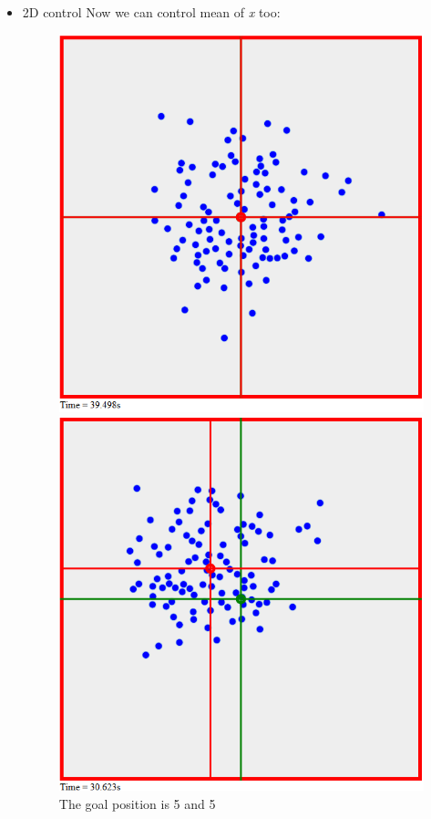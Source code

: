\begin{itemize}
\item 2D control
Now we can control mean of \emph{x} too:
\begin{figure}[!htb]
\captionsetup{justification=centering}
  \includegraphics[width=\linewidth]{fig/2DControl.png}
  \caption{The goal position is 5 and 5}
\endminipage\hfill
{}
  \includegraphics[width=\linewidth]{fig/2DControl2.png}

\end{figure}
\end{itemize}
